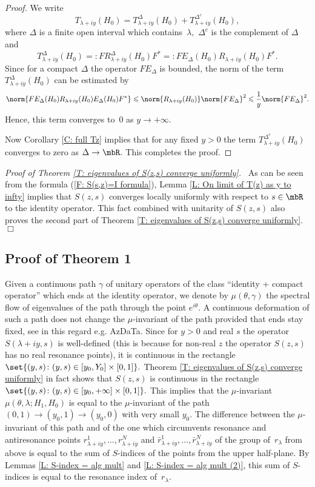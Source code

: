 \documentclass[11pt]{amsart}
\let\leq\leqslant
\numberwithin{equation}{section}
\begin{document}
\begin{proof} We write
$$
  T_{\lambda+iy}(H_0) = T^\Delta_{\lambda+iy}(H_0) + T^{\Delta^c}_{\lambda+iy}(H_0),
$$
where $\Delta$ is a finite open interval which contains~$\lambda,$ $\Delta^c$ is the complement of $\Delta$ and
$$
  T^\Delta_{\lambda+iy}(H_0) =: F R^\Delta_{\lambda+iy}(H_0)F^* =: F E_\Delta(H_0)R_{\lambda+iy}(H_0)F^*.
$$
Since for a compact $\Delta$ the operator $F E_\Delta$ is bounded,
the norm of the term $T^\Delta_{\lambda+iy}(H_0)$ can be estimated by
$$
  \norm{F E_\Delta(H_0)R_{\lambda+iy}(H_0)E_\Delta(H_0) F^*} \leq  \norm{R_{\lambda+iy}(H_0)} \norm{F E_\Delta}^2 \leq \frac 1y \norm{F E_\Delta}^2.
$$
Hence, this term converges to~$0$ as $y \to +\infty.$

Now Corollary \ref{C: full Tz} implies that for any fixed $y>0$ the term $T^{\Delta^c}_{\lambda+iy}(H_0)$ converges to zero as $\Delta \to \mbR.$
This completes the proof.
\end{proof}

{\it Proof of Theorem \ref{T: eigenvalues of S(z,s) converge uniformly}.} \
As can be seen from the formula (\ref{F: S(s,z)=I formula}), Lemma \ref{L: On limit of T(z) as y to infty} implies that $S(z,s)$ converges
locally uniformly with respect to $s \in \mbR$ to the identity operator.
This fact combined with unitarity of $S(z,s)$ also proves the second part of Theorem \ref{T: eigenvalues of S(z,s) converge uniformly}.
$\Box$

\subsection{Proof of Theorem 1}
Given a continuous path $\gamma$ of unitary operators of the class ``identity + compact operator'' which ends at the identity operator,
we denote by $\mu(\theta, \gamma)$ the spectral flow of eigenvalues of the path through the point $e^{i\theta}.$ A continuous deformation of such a path does not change
the $\mu$-invariant of the path provided that ends stay fixed, see in this regard e.g. {\futurelet\NChar\CleverCite}{AzDaTa}.
Since for $y>0$ and real $s$ the operator $S(\lambda+iy,s)$ is well-defined
(this is because for non-real $z$ the operator $S(z,s)$ has no real resonance points), it is continuous in the rectangle $\set{(y,s) \colon (y,s) \in [y_0,Y_0] \times [0,1]}.$
Theorem \ref{T: eigenvalues of S(z,s) converge uniformly}  in fact shows that $S(z,s)$ is continuous in the rectangle $\set{(y,s) \colon (y,s) \in [y_0,+\infty] \times [0,1]}.$
This implies that the $\mu$-invariant $\mu(\theta,\lambda; H_1,H_0)$ is equal to the $\mu$-invariant of the path $(0,1) \to (y_0,1) \to (y_0,0)$ with very small $y_0.$
The difference between the $\mu$-invariant of this path and of the one which circumvents resonance and antiresonance points $r_{\lambda+iy}^1,\ldots,r_{\lambda+iy}^N$
and $\bar r_{\lambda+iy}^1,\ldots,\bar r_{\lambda+iy}^N$ of the group of~$r_\lambda$ from above is equal to the sum of $S$-indices of the points from the upper half-plane.
By Lemmas \ref{L: S-index = alg mult} and \ref{L: S-index = alg mult (2)}, this sum of $S$-indices is equal to the resonance index of~$r_\lambda.$
\end{document}
